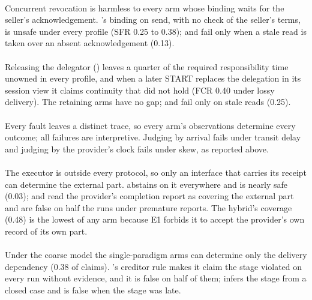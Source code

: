 \paragraph{} Concurrent revocation is harmless to every arm whose binding waits for the seller's acknowledgement. 's binding on send, with no check of the seller's terms, is unsafe under every profile (SFR 0.25 to 0.38);  and  fail only when a stale read is taken over an absent acknowledgement (0.13).

\paragraph{} Releasing the delegator () leaves a quarter of the required responsibility time unowned in every profile, and when a later START replaces the delegation in its session view it claims continuity that did not hold (FCR 0.40 under lossy delivery). The retaining arms have no gap;  and  fail only on stale reads (0.25).

\paragraph{} Every fault leaves a distinct trace, so every arm's observations determine every outcome; all failures are interpretive. Judging by arrival fails under transit delay and judging by the provider's clock fails under skew, as reported above.

\paragraph{} The executor is outside every protocol, so only an interface that carries its receipt can determine the external part.  abstains on it everywhere and is nearly safe (0.03);  and  read the provider's completion report as covering the external part and are false on half the runs under premature reports. The hybrid's coverage (0.48) is the lowest of any arm because E1 forbids it to accept the provider's own record of its own part.

\paragraph{} Under the coarse model the single-paradigm arms can determine only the delivery dependency (0.38 of claims). 's creditor rule makes it claim the stage violated on every run without evidence, and it is false on half of them;  infers the stage from a closed case and is false when the stage was late.

